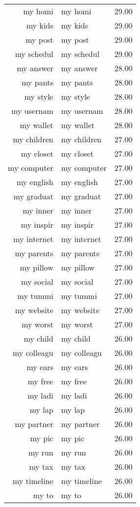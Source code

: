 \begin{table}[ht]
\begin{tabular}{rlr}
  my homi & my homi & 29.00 \\ 
  my kids & my kids & 29.00 \\ 
  my post & my post & 29.00 \\ 
  my schedul & my schedul & 29.00 \\ 
  my answer & my answer & 28.00 \\ 
  my pants & my pants & 28.00 \\ 
  my style & my style & 28.00 \\ 
  my usernam & my usernam & 28.00 \\ 
  my wallet & my wallet & 28.00 \\ 
  my children & my children & 27.00 \\ 
  my closet & my closet & 27.00 \\ 
  my computer & my computer & 27.00 \\ 
  my english & my english & 27.00 \\ 
  my graduat & my graduat & 27.00 \\ 
  my inner & my inner & 27.00 \\ 
  my inspir & my inspir & 27.00 \\ 
  my internet & my internet & 27.00 \\ 
  my parents & my parents & 27.00 \\ 
  my pillow & my pillow & 27.00 \\ 
  my social & my social & 27.00 \\ 
  my tummi & my tummi & 27.00 \\ 
  my website & my website & 27.00 \\ 
  my worst & my worst & 27.00 \\ 
  my child & my child & 26.00 \\ 
  my colleagu & my colleagu & 26.00 \\ 
  my ears & my ears & 26.00 \\ 
  my free & my free & 26.00 \\ 
  my ladi & my ladi & 26.00 \\ 
  my lap & my lap & 26.00 \\ 
  my partner & my partner & 26.00 \\ 
  my pic & my pic & 26.00 \\ 
  my run & my run & 26.00 \\ 
  my tax & my tax & 26.00 \\ 
  my timeline & my timeline & 26.00 \\ 
  my to & my to & 26.00 \\ 

\end{tabular}
\end{table}

